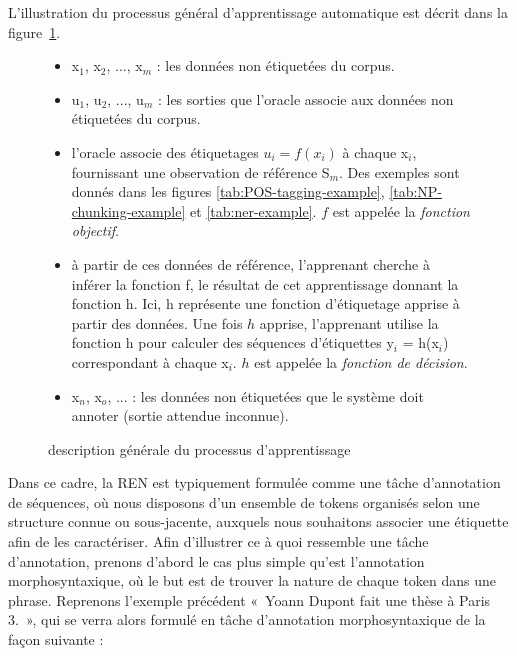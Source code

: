 \documentclass[12pt,a4paper,times,twoside,openright]{report}
\begin{document}
L'illustration du processus général d'apprentissage automatique est décrit dans la figure\ \ref{fig:machine-learning-general}.

\begin{figure}[ht!]
\begin{itemize}
    \item x$_{1}$, x$_{2}$, ..., x$_{m}$ : les données non étiquetées du corpus.
    \item u$_{1}$, u$_{2}$, ..., u$_{m}$ : les sorties que l'oracle associe aux données non étiquetées du corpus.
    \item l'oracle associe des étiquetages $u_{i} = f(x_{i})$ à chaque x$_{i}$, fournissant une observation de référence S$_{m}$. Des exemples sont donnés dans les figures \ref{tab:POS-tagging-example}, \ref{tab:NP-chunking-example} et \ref{tab:ner-example}. $f$ est appelée la \emph{fonction objectif}.
    \item à partir de ces données de référence, l'apprenant cherche à inférer la fonction f, le résultat de cet apprentissage donnant la fonction h. Ici, h représente une fonction d'étiquetage apprise à partir des données. Une fois $h$ apprise, l'apprenant utilise la fonction h pour calculer des séquences d'étiquettes y$_{i}$ = h(x$_{i}$) correspondant à chaque x$_{i}$. $h$ est appelée la \emph{fonction de décision}.
    \item x$_{n}$, x$_{o}$, ... : les données non étiquetées que le système doit annoter (sortie attendue inconnue).
\end{itemize}
\caption{description générale du processus d'apprentissage}
\label{fig:machine-learning-general}
\end{figure}

Dans ce cadre, la REN est typiquement formulée comme une tâche d'annotation de séquences, où nous disposons d'un ensemble de tokens organisés selon une structure connue ou sous-jacente, auxquels nous souhaitons associer une étiquette afin de les caractériser. Afin d'illustrer ce à quoi ressemble une tâche d'annotation, prenons d'abord le cas plus simple qu'est l'annotation morphosyntaxique, où le but est de trouver la nature de chaque token dans une phrase. Reprenons l'exemple précédent «\ Yoann Dupont fait une thèse à Paris 3.\ », qui se verra alors formulé en tâche d'annotation morphosyntaxique de la façon suivante :
\end{document}

